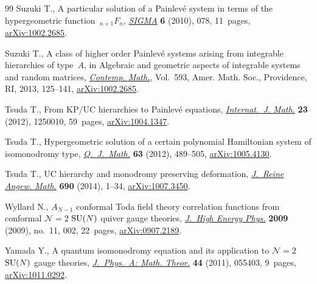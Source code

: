 \documentclass[pdftex]{sigma}
\numberwithin{equation}{section}
\begin{document}
\begin{thebibliography}{99}
Suzuki T., A particular solution of a {P}ainlev\'{e} system in terms of the
 hypergeometric function~{$_{n+1}F_n$}, \href{https://doi.org/10.3842/SIGMA.2010.078}{\textit{SIGMA}} \textbf{6} (2010), 078,
 11~pages, \href{https://arxiv.org/abs/1002.2685}{arXiv:1002.2685}.

Suzuki T., A class of higher order {P}ainlev\'{e} systems arising from
 integrable hierarchies of type~{$A$}, in Algebraic and geometric aspects of
 integrable systems and random matrices, \href{https://doi.org/10.1090/conm/593/11875}{\textit{Contemp. Math.}}, Vol.~593,
 Amer. Math. Soc., Providence, RI, 2013, 125--141, \href{https://arxiv.org/abs/1002.2685}{arXiv:1002.2685}.

Tsuda T., From {KP}/{UC} hierarchies to {P}ainlev\'{e} equations,
 \href{https://doi.org/10.1142/S0129167X11007537}{\textit{Internat.~J. Math.}} \textbf{23} (2012), 1250010, 59~pages,
 \href{https://arxiv.org/abs/1004.1347}{arXiv:1004.1347}.

Tsuda T., Hypergeometric solution of a certain polynomial {H}amiltonian system
 of isomonodromy type, \href{https://doi.org/10.1093/qmath/haq040}{\textit{Q.~J.~Math.}} \textbf{63} (2012), 489--505,
 \href{https://arxiv.org/abs/1005.4130}{arXiv:1005.4130}.

Tsuda T., U{C} hierarchy and monodromy preserving deformation, \href{https://doi.org/10.1515/crelle-2012-0022}{\textit{J.~Reine
 Angew. Math.}} \textbf{690} (2014), 1--34, \href{https://arxiv.org/abs/1007.3450}{arXiv:1007.3450}.

Wyllard N., {$A_{N-1}$} conformal {T}oda field theory correlation functions
 from conformal {${\mathcal N}=2$} {${\rm SU}(N)$} quiver gauge theories,
 \href{https://doi.org/10.1088/1126-6708/2009/11/002}{\textit{J.~High Energy Phys.}} \textbf{2009} (2009), no.~11, 002, 22~pages,
 \href{https://arxiv.org/abs/0907.2189}{arXiv:0907.2189}.

Yamada Y., A quantum isomonodromy equation and its application to {${\mathcal
 N}=2$} {${\rm SU}(N)$} gauge theories, \href{https://doi.org/10.1088/1751-8113/44/5/055403}{\textit{J.~Phys.~A: Math. Theor.}}
 \textbf{44} (2011), 055403, 9~pages, \href{https://arxiv.org/abs/1011.0292}{arXiv:1011.0292}.

\end{thebibliography}\LastPageEnding
\end{document}
